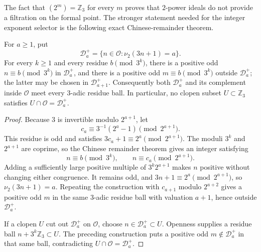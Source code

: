 The fact that $(2^m)=\mathbb Z_3$ for every $m$ proves that $2$-power ideals
do not provide a filtration on the formal point.  The stronger statement
needed for the integer exponent selector is the following exact
Chinese-remainder theorem.

\begin{proposition}
\label{prop:no-three-adic-valuation-selector}
For $a\geq1$, put
\[
 \mathcal D_a^+
 =\{n\in\mathcal O:\nu_2(3n+1)=a\}.
\]
For every $k\geq1$ and every residue $b\pmod{3^k}$, there is a positive odd
$n\equiv b\pmod{3^k}$ in $\mathcal D_a^+$, and there is a positive odd
$m\equiv b\pmod{3^k}$ outside $\mathcal D_a^+$; the latter may be chosen in
$\mathcal D_{a+1}^+$.  Consequently both $\mathcal D_a^+$ and its complement
inside $\mathcal O$ meet every $3$-adic residue ball.  In particular, no
clopen subset $U\subset\mathbb Z_3$ satisfies
$U\cap\mathcal O=\mathcal D_a^+$.
\end{proposition}

\begin{proof}
Because $3$ is invertible modulo $2^{a+1}$, let
\[
 c_a\equiv3^{-1}(2^a-1)\pmod{2^{a+1}}.
\]
This residue is odd and satisfies
$3c_a+1\equiv2^a\pmod{2^{a+1}}$.  The moduli $3^k$ and $2^{a+1}$ are
coprime, so the Chinese remainder theorem gives an integer satisfying
\[
 n\equiv b\pmod{3^k},
 \qquad n\equiv c_a\pmod{2^{a+1}}.
\]
Adding a sufficiently large positive multiple of $3^k2^{a+1}$ makes $n$
positive without changing either congruence.  It remains odd, and
$3n+1\equiv2^a\pmod{2^{a+1}}$, so $\nu_2(3n+1)=a$.  Repeating the construction
with $c_{a+1}$ modulo $2^{a+2}$ gives a positive odd $m$ in the same
$3$-adic residue ball with valuation $a+1$, hence outside
$\mathcal D_a^+$.

If a clopen $U$ cut out $\mathcal D_a^+$ on $\mathcal O$, choose
$n\in\mathcal D_a^+\subset U$.  Openness supplies a residue ball
$n+3^k\mathbb Z_3\subset U$.  The preceding construction puts a positive odd
$m\notin\mathcal D_a^+$ in that same ball, contradicting
$U\cap\mathcal O=\mathcal D_a^+$.
\end{proof}

